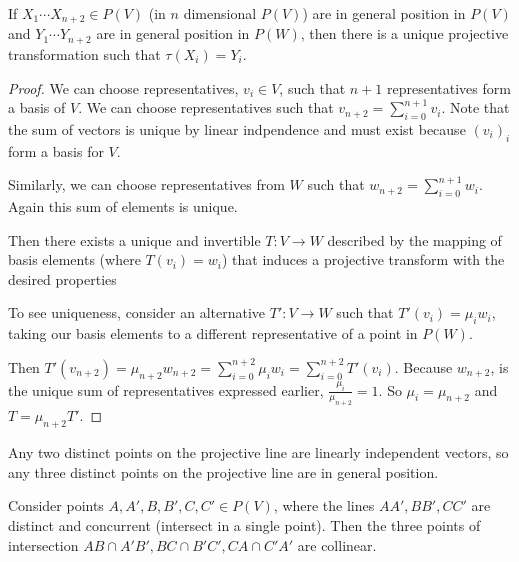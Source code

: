 \documentclass[10pt]{article}
\begin{document}
\begin{theorem}
	 If $X_1 \cdots X_{n+2} \in P(V)$ (in $n$ dimensional $P(V)$) are in general
	 position in $P(V)$ and $Y_1 \cdots Y_{n+2}$ are in general position in
	 $P(W)$, then there is a unique projective transformation such that
	 $\tau(X_i) = Y_i$.
\end{theorem}

\begin{proof}

	We can choose representatives, $v_i \in V$, such that $n+1$ representatives
	form a basis of $V$. We can choose representatives such that
	$v_{n+2} = \sum_{i=0}^{n+1} v_i$. Note that the sum of vectors is unique by
	linear indpendence and must exist because $( v_i )_i$ form a basis for $V$.

	Similarly, we can choose representatives from $W$ such that $w_{n+2} =
	\sum_{i=0}^{n+1} w_i$. Again this sum of elements is unique.

	Then there exists a unique and invertible $T: V \to W$ described by the mapping of basis
	elements (where $T(v_i) = w_i$) that induces a projective transform with the
	desired properties

	To see uniqueness, consider an alternative $T': V \to W$ such that $T'(v_i) =
	\mu_i w_i$, taking our basis elements to a different representative of a point in $P(W)$.

	Then $T'(v_{n+2}) = \mu_{n+2} w_{n+2} = \sum_{i=0}^{n+2} \mu_i w_i =
	\sum_{i=0}^{n+2} T'(v_i)$. Because $w_{n+2}$, is the unique sum of
	representatives expressed earlier, $\frac{\mu_i}{\mu_{n+2}} = 1$. So $\mu_i =
	\mu_{n+2}$ and $T = \mu_{n+2}T'$.

\end{proof}

\begin{note}
Any two distinct points on the projective line are linearly independent
vectors, so any three distinct points on the projective line are in general
position.
\end{note}

\begin{theorem}
	Consider points $A, A', B, B', C, C' \in P(V)$, where the lines $AA', BB',
	CC'$ are distinct and concurrent (intersect in a single point). Then the
	three points of intersection $AB \cap A'B', BC \cap B'C', CA \cap C'A'$ are
	collinear.
\end{theorem}
\end{document}

